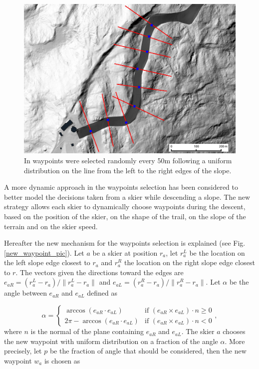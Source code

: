 \documentclass[12pt,a4paper,twoside]{book}
\newcommand{\norm}[1]{\lVert#1\rVert}
\begin{document}
\begin{figure}
  \begin{center}
    \includegraphics[width=\textwidth]{images/waypoint_line.eps}
    \caption{In \cite{hol2012} waypoints were selected randomly every 50m following a uniform distribution on the line from the left to the right edges of the slope.}\label{waypoints_old_pic}
  \end{center}
\end{figure}

A more dynamic approach in the waypoints selection has been considered to better model the decisions taken from a skier while descending a slope. The new strategy allows each skier to dynamically choose waypoints during the descent, based on the position of the skier, on the shape of the trail, on the slope of the terrain and on the skier speed.

Hereafter the new mechanism for the waypoints selection is explained (see Fig.\ref{new_waypoint_pic}). Let $a$ be a skier at position $r_a$, let $r_a^L$ be the location on the left slope edge closest to $r_a$ and $r_a^R$ the location on the right slope edge closest to $r$. The vectors given the directions toward the edges are $e_{aR}=\left(r_a^L-r_a\right)/\norm{r_a^L-r_a}$ and $e_{aL}=\left(r_a^R-r_a\right)/\norm{r_a^R-r_a}$. Let $\alpha$ be the angle between $e_{aR}$ and $e_{aL}$ defined as

\begin{equation}
\alpha=\begin{cases}
  \arccos(e_{aR} \cdot e_{aL}) & \text{if } (e_{aR} \times e_{aL})\cdot n \ge 0 \\
  2\pi-\arccos(e_{aR} \cdot e_{aL}) & \text {if } (e_{aR} \times e_{aL})\cdot n < 0
\end{cases},
\end{equation}
where $n$ is the normal of the plane containing $e_{aR}$ and $e_{aL}$. The skier $a$ chooses the new waypoint with uniform distribution on a fraction of the angle $\alpha$. More precisely, let $p$ be the fraction of angle that should be considered, then the new waypoint $w_a$ is chosen as
\end{document}
